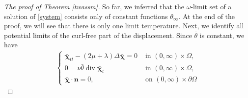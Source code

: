 \documentclass[11pt]{article}
\numberwithin{equation}{section}
\theoremstyle{plain}
\newcommand\bb[1]{\mathbf{#1}}
\renewcommand{\div}{\operatorname{div}}
\newcommand{\ot}{(0,\infty)\times\Omega}
\newcommand{\wspnd}{2\mu+\lambda}
\newcommand{\bs}[1]{\boldsymbol{#1}}
\begin{document}
\begin{proof}[The proof of Theorem \ref{twassm}]
So far, we inferred that the $\omega$-limit set of a solution of \eqref{system} consists only of constant functions $\theta_{\infty}$. At the end of the proof, we will see that there is only one limit temperature. Next, we identify all potential limits of the curl-free part of the displacement. Since $\bar{\theta}$ is constant, we have
\begin{align}\label{szesc}
\begin{cases}
\bar{\bs\chi}_{tt}-(\wspnd)\Delta\bar{\bs\chi}=0& \text{ in }\ot,\\
0=\nu\bar \theta\div\bar{\bs\chi}_{t}&\text{ in }\ot,\\
\bar{\bs\chi}\cdot\bb n=0,&\text{ on }(0,\infty)\times\partial\Omega
\end{cases}
\end{align}


\end{proof}
\end{document}
